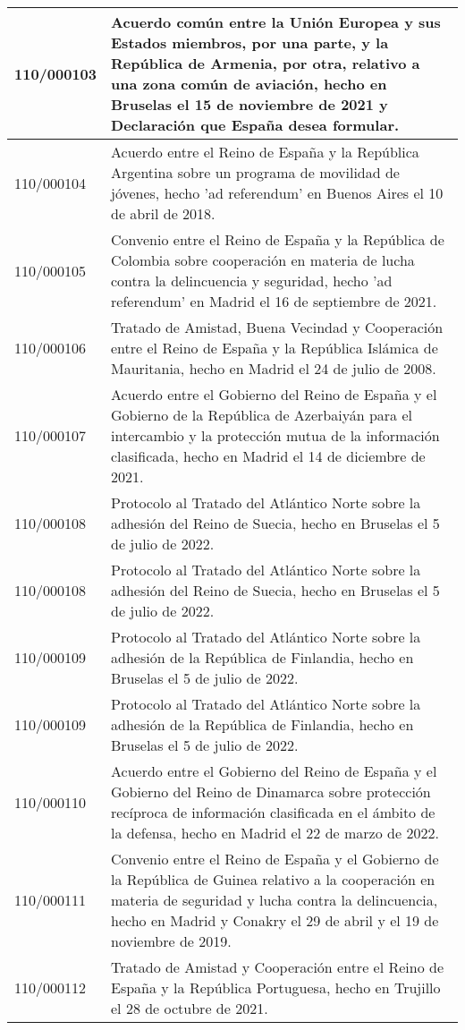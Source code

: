 {\begin{table}[H]
\begin{center}
\begin{tabularx}{\linewidth}{| l | X |}
\hline
110/000103 & Acuerdo común entre la Unión Europea y sus Estados miembros, por una parte, y la República de Armenia, por otra, relativo a una zona común de aviación, hecho en Bruselas el 15 de noviembre de 2021 y Declaración que España desea formular. \\
\hline
110/000104 & Acuerdo entre el Reino de España y la República Argentina sobre un programa de movilidad de jóvenes, hecho 'ad referendum' en Buenos Aires el 10 de abril de 2018. \\
\hline
110/000105 & Convenio entre el Reino de España y la República de Colombia sobre cooperación en materia de lucha contra la delincuencia y seguridad, hecho 'ad referendum' en Madrid el 16 de septiembre de 2021. \\
\hline
110/000106 & Tratado de Amistad, Buena Vecindad y Cooperación entre el Reino de España y la República Islámica de Mauritania, hecho en Madrid el 24 de julio de 2008. \\
\hline
110/000107 & Acuerdo entre el Gobierno del Reino de España y el Gobierno de la República de Azerbaiyán para el intercambio y la protección mutua de la información clasificada, hecho en Madrid el 14 de diciembre de 2021. \\
\hline
110/000108 & Protocolo al Tratado del Atlántico Norte sobre la adhesión del Reino de Suecia, hecho en Bruselas el 5 de julio de 2022. \\
\hline
110/000108 & Protocolo al Tratado del Atlántico Norte sobre la adhesión del Reino de Suecia, hecho en Bruselas el 5 de julio de 2022. \\
\hline
110/000109 & Protocolo al Tratado del Atlántico Norte sobre la adhesión de la República de Finlandia, hecho en Bruselas el 5 de julio de 2022. \\
\hline
110/000109 & Protocolo al Tratado del Atlántico Norte sobre la adhesión de la República de Finlandia, hecho en Bruselas el 5 de julio de 2022. \\
\hline
110/000110 & Acuerdo entre el Gobierno del Reino de España y el Gobierno del Reino de Dinamarca sobre protección recíproca de información clasificada en el ámbito de la defensa, hecho en Madrid el 22 de marzo de 2022. \\
\hline
110/000111 & Convenio entre el Reino de España y el Gobierno de la República de Guinea relativo a la cooperación en materia de seguridad y lucha contra la delincuencia, hecho en Madrid y Conakry el 29 de abril y el 19 de noviembre de 2019. \\
\hline
110/000112 & Tratado de Amistad y Cooperación entre el Reino de España y la República Portuguesa, hecho en Trujillo el 28 de octubre de 2021. \\

\end{tabularx}
\end{center}
\end{table}}

